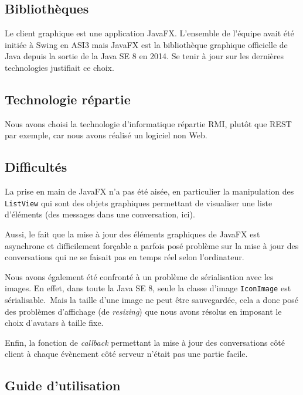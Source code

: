 \documentclass[11pt,dvipsnames,svgnames]{report}
\begin{document}
\subsection{Bibliothèques}
Le client graphique est une application JavaFX. L'ensemble de l'équipe avait été initiée à Swing en ASI3 mais JavaFX est la bibliothèque graphique officielle de Java depuis la sortie de la Java SE 8 en 2014. Se tenir à jour sur les dernières technologies justifiait ce choix.
\subsection{Technologie répartie}
Nous avons choisi la technologie d'informatique répartie RMI, plutôt que REST par exemple, car nous avons réalisé un logiciel non Web.
\subsection{Difficultés}
La prise en main de JavaFX n'a pas été aisée, en particulier la manipulation des \texttt{ListView} qui sont des objets graphiques permettant de visualiser une liste d'éléments (des messages dans une conversation, ici).

Aussi, le fait que la mise à jour des éléments graphiques de JavaFX est asynchrone et difficilement forçable a parfois posé problème sur la mise à jour des conversations qui ne se faisait pas en temps réel selon l'ordinateur.

Nous avons également été confronté à un problème de sérialisation avec les images. En effet, dans toute la Java SE 8, seule la classe d'image \texttt{IconImage} est sérialisable. Mais la taille d'une image ne peut être sauvegardée, cela a donc posé des problèmes d'affichage (de \emph{resizing}) que nous avons résolus en imposant le choix d'avatars à taille fixe.

Enfin, la fonction de \emph{callback} permettant la mise à jour des conversations côté client à chaque évènement côté serveur n'était pas une partie facile.
\subsection{Guide d'utilisation}
\end{document}
